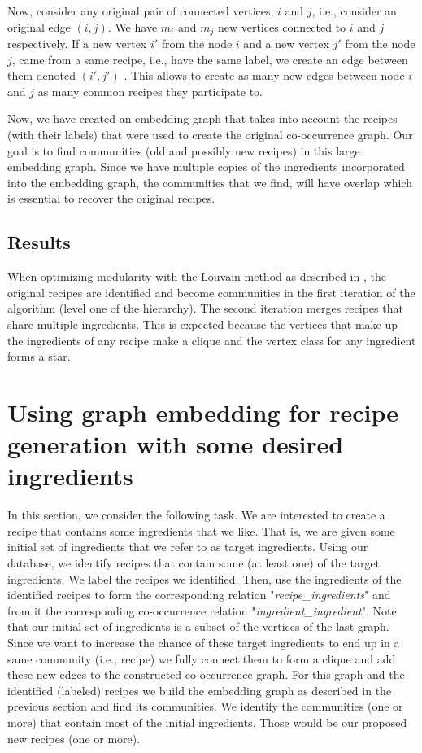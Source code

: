 \documentclass[conference]{IEEEtran}
\begin{document}
Now, consider any original pair of connected vertices, $i$ and $j$, i.e., consider an original edge $(i,j)$. 
We have $m_i$ and $m_j$ new vertices connected to $i$ and $j$ respectively. 
If a new vertex $i{'}$ from the node $i$ and a new vertex $j{'}$ from the node $j$, came from a same recipe, i.e., have the same label,  we create an edge between them denoted $(i{'},j{'})$ .
This allows to create as many new edges between node $i$ and $j$ as many common recipes they participate to. 

Now, we have created an embedding graph that takes into account the recipes (with their labels) that were used to create the original co-occurrence graph.   
Our goal is to find communities (old and possibly new recipes)  in this large embedding graph. Since we have multiple copies of the ingredients incorporated into
the embedding graph, the communities that we find, will have overlap which is essential to recover the original  recipes.  

\subsection{Results}

When optimizing modularity with the Louvain method as described in \cite{blondel08}, the original recipes are identified and become communities in the first iteration of the
algorithm (level one of the hierarchy). The second iteration merges recipes that share multiple ingredients. This is expected because the vertices that make up the ingredients
of any recipe make a clique and the vertex class for any ingredient forms a star. 

\section{Using graph embedding for recipe generation with some desired ingredients}
In this section, we consider the following task.
We are interested to create a recipe that contains some ingredients that we like. 
That is, we are given some initial set of ingredients that we refer to as target ingredients. Using our database, we identify recipes that contain some (at least one) of  the target ingredients.
We label the recipes we identified. Then, use the ingredients of the identified recipes to form the corresponding relation "{\em recipe\_ingredients}"
and from it the corresponding co-occurrence relation "{\em ingredient\_ingredient}". Note that our initial set of ingredients is a subset of the vertices of the last graph.
Since we want to increase the chance of these target ingredients to end up in a same community (i.e., recipe) we fully  connect them to form a clique and add these new edges
to the constructed co-occurrence graph. For this graph and the identified (labeled) recipes we build the embedding graph as described in the previous section and find its communities.
We identify the communities (one or more) that contain most of the  initial ingredients. Those would be our proposed new recipes (one or more). 
\end{document}
